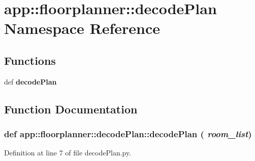 \section{app::floorplanner::decodePlan Namespace Reference}
\label{namespaceapp_1_1floorplanner_1_1decodePlan}


\subsection*{Functions}
\begin{CompactItemize}
\item 
def {\bf decodePlan}
\end{CompactItemize}


\subsection{Function Documentation}
\subsubsection{\setlength{\rightskip}{0pt plus 5cm}def app::floorplanner::decodePlan::decodePlan ( {\em room\_\-list})}\label{namespaceapp_1_1floorplanner_1_1decodePlan_bced922808585dcfc21b887a1f0af2eb}




Definition at line 7 of file decodePlan.py.